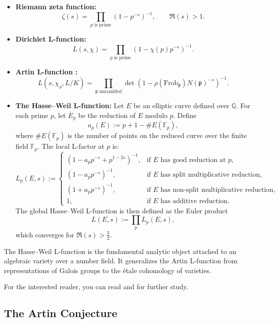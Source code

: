 \begin{itemize}
    \item[(a)] \textbf{Riemann zeta function:}
    \[
    \zeta(s) = \prod_{p\text{ is prime}} \left(1 - p^{-s}\right)^{-1}, \qquad \Re(s) > 1.
    \]

    \item[(b)] \textbf{Dirichlet L-function:}
    \[
    L(s, \chi) = \prod_{p\text{ is prime}} \left(1 - \chi(p) p^{-s}\right)^{-1}.
    \]

    \item[(c)] \textbf{Artin L-function :}
    \[
    L(s, \chi_\rho, L/K) = \prod_{\mathfrak{p} \text{ unramified}} 
    \det\left(1 - \rho(\mathrm{Frob}_{\mathfrak{p}}) N(\mathfrak{p})^{-s}\right)^{-1}.
    \]

    \item[(d)]\textbf{The Hasse--Weil L-function:}
    Let \(E\) be an elliptic curve defined over \(\mathbb{Q}\). For each prime \(p\), let \(\overline{E}_p\) be the reduction of \(E\) modulo \(p\). Define
\[
a_p(E) := p + 1 - \#E(\mathbb{F}_p),
\]
where \(\#E(\mathbb{F}_p)\) is the number of points on the reduced curve over the finite field \(\mathbb{F}_p\). The local L-factor at \(p\) is:
\[
L_p(E, s) :=
\begin{cases}
\left(1 - a_p p^{-s} + p^{1-2s}\right)^{-1}, & \text{if } E \text{ has good reduction at } p,\\[4pt]
\left(1 - a_p p^{-s}\right)^{-1}, & \text{if } E \text{ has split multiplicative reduction},\\[4pt]
\left(1 + a_p p^{-s}\right)^{-1}, & \text{if } E \text{ has non-split multiplicative reduction},\\[4pt]
1, & \text{if } E \text{ has additive reduction}.
\end{cases}
\]
The global Hasse--Weil L-function is then defined as the Euler product
\[
L(E, s) := \prod_{p} L_p(E, s),
\]
which converges for \(\Re(s) > \tfrac{3}{2}\).

\end{itemize}

The Hasse--Weil L-function is the fundamental analytic object attached to an algebraic variety over a number field. It generalizes the Artin L-function from representations of Galois groups to the \'etale cohomology of varieties. 

For the interested reader, you can read \cite{marcus1977number} and \cite{milne2020cft} for further study.



\subsection{The Artin Conjecture}


